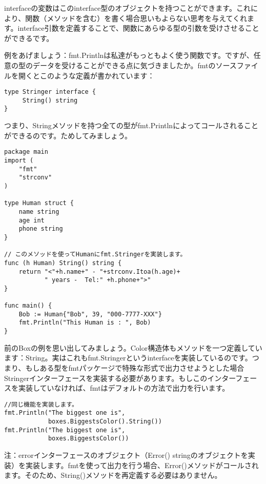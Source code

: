 interfaceの変数はこのinterface型のオブジェクトを持つことができます。これにより、関数（メソッドを含む）を書く場合思いもよらない思考を与えてくれます。interface引数を定義することで、関数にあらゆる型の引数を受けさせることができるです。

例をあげましょう：fmt.Printlnは私達がもっともよく使う関数です。ですが、任意の型のデータを受けることができる点に気づきましたか。fmtのソースファイルを開くとこのような定義が書かれています：


\begin{lstlisting}[numbers=none]
type Stringer interface {
     String() string
}
\end{lstlisting}

つまり、Stringメソッドを持つ全ての型がfmt.Printlnによってコールされることができるのです。ためしてみましょう。

\begin{lstlisting}[numbers=none]
package main
import (
    "fmt"
    "strconv"
)

type Human struct {
    name string
    age int
    phone string
}

// このメソッドを使ってHumanにfmt.Stringerを実装します。
func (h Human) String() string {
    return "<"+h.name+" - "+strconv.Itoa(h.age)+
           " years -  Tel:" +h.phone+">"
}

func main() {
    Bob := Human{"Bob", 39, "000-7777-XXX"}
    fmt.Println("This Human is : ", Bob)
}
\end{lstlisting}

前のBoxの例を思い出してみましょう。Color構造体もメソッドを一つ定義しています：String。実はこれもfmt.Stringerというinterfaceを実装しているのです。つまり、もしある型をfmtパッケージで特殊な形式で出力させようとした場合Stringerインターフェースを実装する必要があります。もしこのインターフェースを実装していなければ、fmtはデフォルトの方法で出力を行います。

\begin{lstlisting}[numbers=none]
//同じ機能を実装します。
fmt.Println("The biggest one is",
            boxes.BiggestsColor().String())
fmt.Println("The biggest one is",
            boxes.BiggestsColor())
\end{lstlisting}

注：errorインターフェースのオブジェクト（Error() stringのオブジェクトを実装）を実装します。fmtを使って出力を行う場合、Error()メソッドがコールされます。そのため、String()メソッドを再定義する必要はありません。
